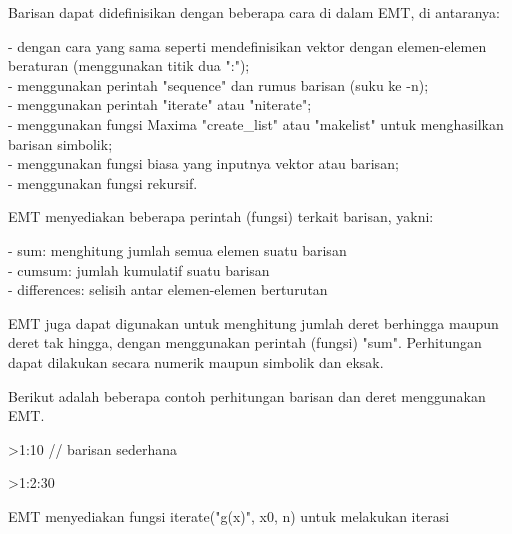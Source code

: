 \documentclass{article}
\begin{document}
\begin{eulernotebook}
\begin{eulercomment}
\begin{eulercomment}
\begin{eulercomment}
\begin{eulercomment}
\begin{eulercomment}
Barisan dapat didefinisikan dengan beberapa cara di dalam EMT, di antaranya:

- dengan cara yang sama seperti mendefinisikan vektor dengan elemen-elemen beraturan
(menggunakan titik dua ":");\\
- menggunakan perintah "sequence" dan rumus barisan (suku ke -n);\\
- menggunakan perintah "iterate" atau "niterate";\\
- menggunakan fungsi Maxima "create\_list" atau "makelist" untuk menghasilkan barisan
simbolik;\\
- menggunakan fungsi biasa yang inputnya vektor atau barisan;\\
- menggunakan fungsi rekursif.

EMT menyediakan beberapa perintah (fungsi) terkait barisan, yakni:

- sum: menghitung jumlah semua elemen suatu barisan\\
- cumsum: jumlah kumulatif suatu barisan\\
- differences: selisih antar elemen-elemen berturutan

EMT juga dapat digunakan untuk menghitung jumlah deret berhingga maupun deret tak hingga,
dengan menggunakan perintah (fungsi) "sum". Perhitungan dapat dilakukan secara numerik
maupun simbolik dan eksak.

Berikut adalah beberapa contoh perhitungan barisan dan deret menggunakan EMT.
\end{eulercomment}
\begin{eulerprompt}
>1:10 // barisan sederhana
\end{eulerprompt}
\begin{euleroutput}
  [1,  2,  3,  4,  5,  6,  7,  8,  9,  10]
\end{euleroutput}
\begin{eulerprompt}
>1:2:30
\end{eulerprompt}
\begin{euleroutput}
  [1,  3,  5,  7,  9,  11,  13,  15,  17,  19,  21,  23,  25,  27,  29]
\end{euleroutput}
\begin{eulercomment}
EMT menyediakan fungsi iterate("g(x)", x0, n) untuk melakukan iterasi


\end{eulercomment}
\end{eulercomment}
\end{eulercomment}
\end{eulercomment}
\end{eulercomment}
\end{eulernotebook}
\end{document}
